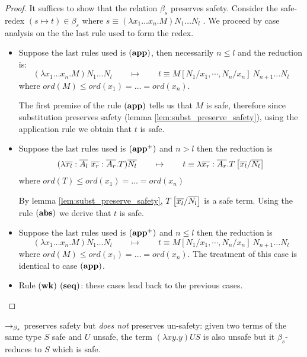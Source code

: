 \begin{proof}
It suffices to show that the relation $\beta_s$ preserves safety.
Consider the safe-redex $(s\mapsto t) \in \beta_s$ where $ s \equiv (\lambda x_1 \ldots x_n . M) N_1 \ldots N_l $ .
We proceed by case analysis on the the last rule used to form the redex.
\begin{itemize}
\item Suppose the last rules used is $\mathbf{(app)}$, then necessarily $n\leq l$ and the reduction is:
$$(\lambda x_1 \ldots x_n . M) N_1 \ldots N_l \qquad \mapsto  \qquad t \equiv M[N_1 / x_1 , \cdots, N_n / x_n]\ N_{n+1} \ldots N_l$$
where $ord(M) \leq ord(x_1) = \ldots = ord(x_n)$.

The first premise of the rule $\mathbf{(app)}$ tells us that $M$ is safe,
therefore since substitution preserves safety (lemma
\ref{lem:subst_preserve_safety}), using the application rule we obtain that $t$ is safe.

\item Suppose the last rules used is $\mathbf{(app^+)}$ and $n> l$ then the reduction is
$$ (\lambda \overline{x_l} : \overline{A_l} \
\overline{x_r}: \overline{A_r} . T) \overline{N_l} \qquad \mapsto
\qquad t \equiv \lambda \overline{x_r}: \overline{A_r} .
T\left[ \overline{x_l}/\overline{N_l} \right]
$$
where $ord(T) \leq ord(x_1) = \ldots = ord(x_n)$

By lemma \ref{lem:subst_preserve_safety}, $T\left[ \overline{x_l}/\overline{N_l} \right]$ is a safe term.
Using the rule $\mathbf{(abs)}$ we derive that $t$ is safe.

\item Suppose the last rules used is $\mathbf{(app^+)}$ and $n\leq l$ then the reduction is
$$(\lambda x_1 \ldots x_n . M) N_1 \ldots N_l \qquad \mapsto \qquad t \equiv M[N_1 / x_1 , \cdots, N_n / x_n]\ N_{n+1} \ldots N_l$$
where $ord(M) \leq ord(x_1) = \ldots = ord(x_n)$. The treatment of this case is identical to case $\mathbf{(app)}$.

\item Rule $\mathbf{(wk)}$ $\mathbf{(seq)}$: these cases lead back to the previous cases.
\end{itemize}
\end{proof}


\begin{rem}
\label{rem:betasred_notpreserv_unsafety} $\rightarrow_{\beta_s}$ preserves
safety but \emph{does not} preserves un-safety: given two terms of
the same type $S$ safe and $U$ unsafe, the term $(\lambda x y . y) U S$ is also unsafe
but it $\beta_s$-reduces to $S$ which is safe.
\end{rem}


